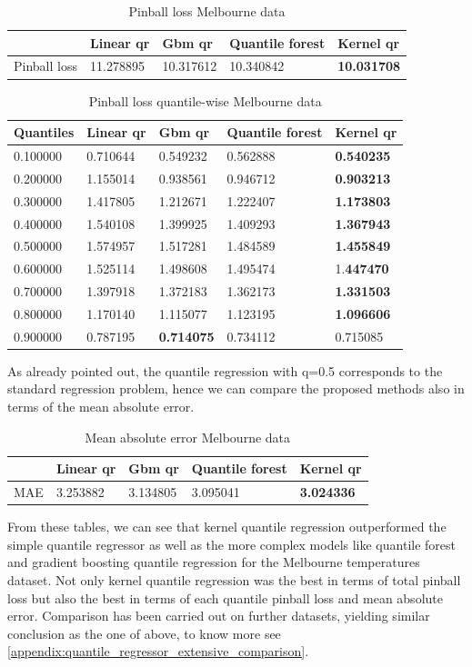 \begin{table}[!h]
\caption{Pinball loss Melbourne data}
\begin{tabular}{lllll}
    \toprule
     & Linear qr & Gbm qr & Quantile forest & Kernel qr \\
    \midrule
    Pinball loss & 11.278895 & 10.317612 & 10.340842 & \textbf{10.031708} \\
    \bottomrule
    \end{tabular}
\end{table}

\begin{table}[!h]
    \caption{Pinball loss quantile-wise Melbourne data}
    \begin{tabular}{lllll}
    \toprule
    Quantiles & Linear qr & Gbm qr & Quantile forest & Kernel qr \\
    \midrule
    0.100000 & 0.710644 & 0.549232 & 0.562888 & \textbf{0.540235} \\
    0.200000 & 1.155014 & 0.938561 & 0.946712 & \textbf{0.903213} \\
    0.300000 & 1.417805 & 1.212671 & 1.222407 & \textbf{1.173803} \\
    0.400000 & 1.540108 & 1.399925 & 1.409293 & \textbf{1.367943} \\
    0.500000 & 1.574957 & 1.517281 & 1.484589 & \textbf{1.455849} \\
    0.600000 & 1.525114 & 1.498608 & 1.495474 & 1.\textbf{447470} \\
    0.700000 & 1.397918 & 1.372183 & 1.362173 & \textbf{1.331503} \\
    0.800000 & 1.170140 & 1.115077 & 1.123195 & \textbf{1.096606} \\
    0.900000 & 0.787195 & \textbf{0.714075} & 0.734112 & 0.715085 \\
    \bottomrule
    \end{tabular}
\end{table}
As already pointed out, the quantile regression with q=0.5 corresponds to the standard regression problem, hence we can compare the proposed methods also in terms of the mean absolute error.
\begin{table}[!h]
\caption{Mean absolute error Melbourne data}
\begin{tabular}{lllll}
    \toprule
     & Linear qr & Gbm qr & Quantile forest & Kernel qr \\
    \midrule
    MAE & 3.253882 & 3.134805 & 3.095041 & \textbf{3.024336} \\
    \bottomrule
    \end{tabular}
\end{table}  
From these tables, we can see that kernel quantile regression outperformed the simple quantile regressor as well as the more complex models like quantile forest and gradient boosting quantile regression for the Melbourne temperatures dataset. Not only kernel quantile regression was the best in terms of total pinball loss but also the best in terms of each quantile pinball loss and mean absolute error.
Comparison has been carried out on further datasets, yielding similar conclusion as the one of above, to know more see \ref{appendix:quantile_regressor_extensive_comparison}.

